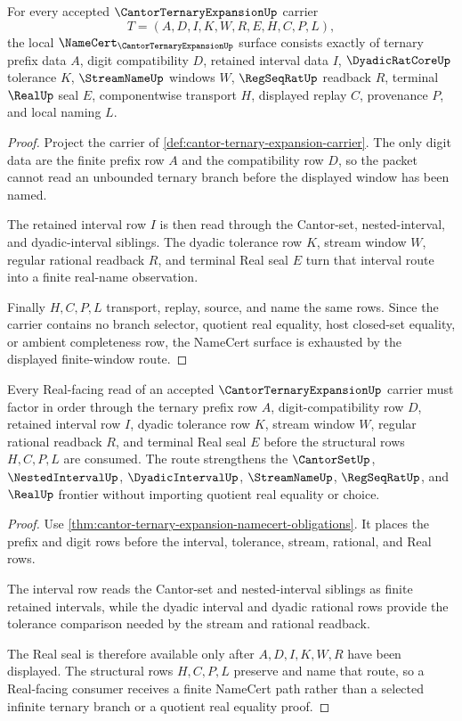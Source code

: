 \begin{theorem}
\label{thm:cantor-ternary-expansion-namecert-obligations}
For every accepted $\CantorTernaryExpansionUp$ carrier
$$
T=(A,D,I,K,W,R,E,H,C,P,L),
$$
the local $\NameCert_{\CantorTernaryExpansionUp}$ surface consists exactly of ternary prefix data $A$, digit compatibility $D$, retained interval data $I$, $\DyadicRatCoreUp$ tolerance $K$, $\StreamNameUp$ windows $W$, $\RegSeqRatUp$ readback $R$, terminal $\RealUp$ seal $E$, componentwise transport $H$, displayed replay $C$, provenance $P$, and local naming $L$.
\end{theorem}
\begin{proof}
Project the carrier of \autoref{def:cantor-ternary-expansion-carrier}. The only digit data are the finite prefix row $A$ and the compatibility row $D$, so the packet cannot read an unbounded ternary branch before the displayed window has been named.

The retained interval row $I$ is then read through the Cantor-set, nested-interval, and dyadic-interval siblings. The dyadic tolerance row $K$, stream window $W$, regular rational readback $R$, and terminal Real seal $E$ turn that interval route into a finite real-name observation.

Finally $H,C,P,L$ transport, replay, source, and name the same rows. Since the carrier contains no branch selector, quotient real equality, host closed-set equality, or ambient completeness row, the NameCert surface is exhausted by the displayed finite-window route.
\end{proof}

\begin{theorem}
\label{thm:cantor-ternary-expansion-real-seal-route}
Every Real-facing read of an accepted $\CantorTernaryExpansionUp$ carrier must factor in order through the ternary prefix row $A$, digit-compatibility row $D$, retained interval row $I$, dyadic tolerance row $K$, stream window $W$, regular rational readback $R$, and terminal Real seal $E$ before the structural rows $H,C,P,L$ are consumed. The route strengthens the $\CantorSetUp$, $\NestedIntervalUp$, $\DyadicIntervalUp$, $\StreamNameUp$, $\RegSeqRatUp$, and $\RealUp$ frontier without importing quotient real equality or choice.
\end{theorem}
\begin{proof}
Use \autoref{thm:cantor-ternary-expansion-namecert-obligations}. It places the prefix and digit rows before the interval, tolerance, stream, rational, and Real rows.

The interval row reads the Cantor-set and nested-interval siblings as finite retained intervals, while the dyadic interval and dyadic rational rows provide the tolerance comparison needed by the stream and rational readback.

The Real seal is therefore available only after $A,D,I,K,W,R$ have been displayed. The structural rows $H,C,P,L$ preserve and name that route, so a Real-facing consumer receives a finite NameCert path rather than a selected infinite ternary branch or a quotient real equality proof.
\end{proof}


